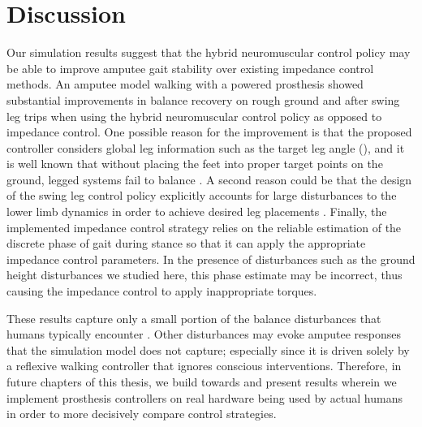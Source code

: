 \section{Discussion}\label{sec:completed_comparison_discuss}

Our simulation results suggest that the hybrid neuromuscular control policy may
be able to improve amputee gait stability over existing impedance control
methods. An amputee model walking with a powered prosthesis showed substantial
improvements in balance recovery on rough ground and after swing leg trips when
using the hybrid neuromuscular control policy as opposed to impedance control.
One possible reason for the improvement is that the proposed controller
considers global leg information such as the target leg angle
(), and it is well known that without placing
the feet into proper target points on the ground, legged systems fail to balance
\citep{townsend1985biped,raibert1986legged,kajita20013d,
seyfarth2002movement,pratt2006capture,wu20133}. A second reason could be that
the design of the swing leg control policy explicitly accounts for large
disturbances to the lower limb dynamics in order to achieve desired leg
placements \citep{desai2012robust}. Finally, the implemented impedance control
strategy relies on the reliable estimation of the discrete phase of gait during
stance so that it can apply the appropriate impedance control parameters. In the
presence of disturbances such as the ground height disturbances we studied here,
this phase estimate may be incorrect, thus causing the impedance control to
apply inappropriate torques.  

These results capture only a small portion of the balance disturbances that
humans typically encounter \citep{robinovitch2013video}. Other disturbances may
evoke amputee responses that the simulation model does not capture; especially
since it is driven solely by a reflexive walking controller that ignores
conscious interventions. Therefore, in future chapters of this thesis, we build
towards and present results wherein we implement prosthesis controllers on real
hardware being used by actual humans in order to more decisively compare control
strategies.
